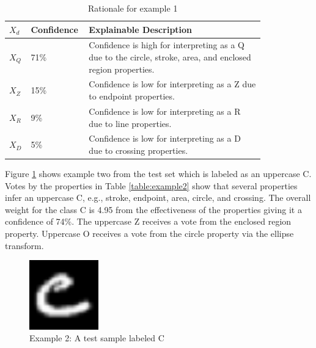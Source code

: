 \documentclass[conference]{IEEEtran}
\begin{document}
\begin{table}
    \caption{Rationale for example 1}
    \centering
    \begin{tabular}{| p{0.04\linewidth} | p{0.14\linewidth} | p{0.65\linewidth} |}
    \hline
     $X_d$ & Confidence & Explainable Description \\
    \hline \cline{1-3}
    $X_Q$ & 71\% & Confidence is high for interpreting as a Q due to the circle, stroke, area, and enclosed region properties. \\ 
    \hline
    $X_Z$ & 15\% & Confidence is low for interpreting as a Z due to endpoint properties. \\
    \hline
    $X_R$ & 9\% & Confidence is low for interpreting as a R due to line properties. \\
    \hline
    $X_D$ & 5\% & Confidence is low for interpreting as a D due to crossing properties. \\
    \hline
    \end{tabular}
    \label{table:exexample1}
\end{table}

Figure \ref{fig:ex2} shows example two from the test set which is labeled as an
uppercase C. Votes by the properties in Table \ref{table:example2} show that
several properties infer an uppercase C, e.g., stroke, endpoint, area, circle,
and crossing. The overall weight for the class C is 4.95 from the effectiveness
of the properties giving it a confidence of 74\%. The uppercase Z receives a
vote from the enclosed region property. Uppercase O receives a vote from the
circle property via the ellipse transform.

\begin{figure}
    \centering
    \includegraphics[width=3cm]{./images/examples/test-C-1.png}
    \caption{Example 2: A test sample labeled C}
    \label{fig:ex2}
\end{figure}
\end{document}
